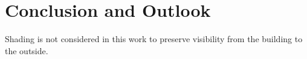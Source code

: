 \chapter{Conclusion and Outlook}
\label{chap:conclusion}
%
Shading is not considered in this work to preserve visibility from the building to the outside.
